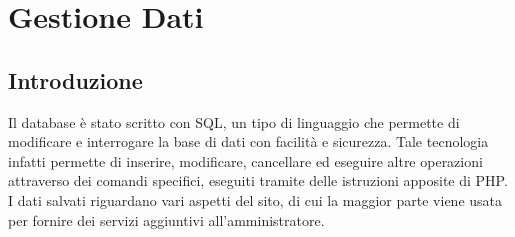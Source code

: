 \section{Gestione Dati}{
	\subsection{Introduzione}
		Il database è stato scritto con SQL, un tipo di linguaggio che permette di modificare e interrogare la base di dati con facilità e sicurezza. Tale tecnologia infatti permette di inserire, modificare, cancellare ed eseguire altre operazioni attraverso dei comandi specifici, eseguiti tramite delle istruzioni apposite di PHP. I dati salvati riguardano vari aspetti del sito, di cui la maggior parte viene usata per fornire dei servizi aggiuntivi all'amministratore.
	
}
